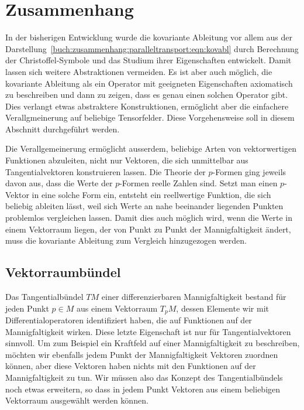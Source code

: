%
%
%

%
%
\section{Zusammenhang
\label{buch:zusammenhang:section:zusammenhang}}
In der bisherigen Entwicklung wurde die kovariante Ableitung vor allem
aus der Darstellung~\eqref{buch:zusammenhang:paralleltransport:eqn:kovabl}
durch Berechnung der Christoffel-Symbole und das Studium ihrer
Eigenschaften entwickelt.
Damit lassen sich weitere Abstraktionen vermeiden.
Es ist aber auch möglich, die kovariante Ableitung als ein Operator
mit geeigneten Eigenschaften axiomatisch zu beschreiben und dann zu
zeigen, dass es genau einen solchen Operator gibt.
Dies verlangt etwas abstraktere Konstruktionen, ermöglicht aber
die einfachere Verallgmeinerung auf beliebige Tensorfelder.
Diese Vorgehensweise soll in diesem Abschnitt durchgeführt werden.

Die Verallgemeinerung ermöglicht ausserdem, beliebige Arten von
vektorwertigen Funktionen abzuleiten, nicht nur Vektoren, die sich
unmittelbar aus Tangentialvektoren konstruieren lassen.
Die Theorie der $p$-Formen ging jeweils davon aus, dass die
Werte der $p$-Formen reelle Zahlen sind.
Setzt man einen $p$-Vektor in eine solche Form ein, entsteht ein
reellwertige Funktion, die sich beliebig ableiten lässt, weil
sich Werte an nahe beeinander liegenden Punkten problemlos
vergleichen lassen.
Damit dies auch möglich wird, wenn die Werte in einem Vektorraum
liegen, der von Punkt zu Punkt der Mannigfaltigkeit ändert, muss
die kovariante Ableitung zum Vergleich hinzugezogen werden.

%
%
\subsection{Vektorraumbündel}
Das Tangentialbündel $TM$ einer differenzierbaren Mannigfaltigkeit
bestand für jeden Punkt $p\in M$ aus einem Vektorraum $T_pM$, dessen
Elemente wir mit Differentialoperatoren identifiziert haben, die
auf Funktionen auf der Mannigfaltigkeit wirken.
Diese letzte Eigenschaft ist nur für Tangentialvektoren sinnvoll.
Um zum Beispiel ein Kraftfeld auf einer Mannigfaltigkeit zu beschreiben,
möchten wir ebenfalls jedem Punkt der Mannigfaltigkeit Vektoren
zuordnen können, aber diese Vektoren haben nichts mit den Funktionen
auf der Mannigfaltigkeit zu tun.
Wir müssen also das Konzept des Tangentialbündels noch etwas
erweitern, so dass in jedem Punkt Vektoren aus einem beliebigen
Vektorraum ausgewählt werden können.

